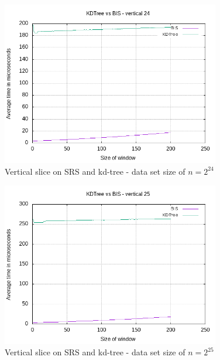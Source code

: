 \begin{figure}[h]
    \centering
    \includegraphics[width = 0.85\textwidth]{pictures/analysis/smalls/vert_24.png}
    \caption{Vertical slice on SRS and kd-tree - data set size of $n=2^{24}$}\label{fig:small_vert_24}
\end{figure}

\begin{figure}[h]
    \centering
    \includegraphics[width = 0.85\textwidth]{pictures/analysis/smalls/vert_25.png}
    \caption{Vertical slice on SRS and kd-tree - data set size of $n=2^{25}$}\label{fig:small_vert_25}
\end{figure}

\clearpage

